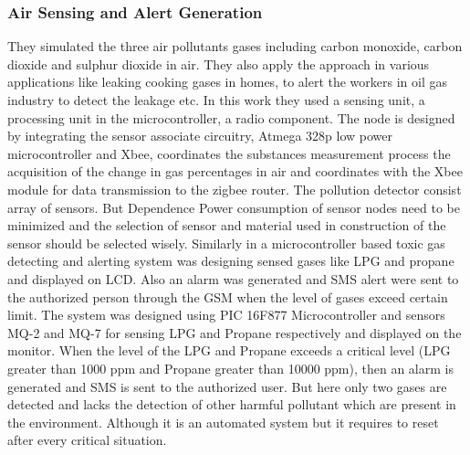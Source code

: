 \subsubsection{Air Sensing and Alert Generation}
They simulated the three air pollutants gases including carbon monoxide, carbon dioxide and sulphur dioxide in air. They also apply the approach in various applications like leaking cooking gases in homes, to alert the workers in oil gas industry to detect the leakage etc. In this work they used a sensing unit, a processing unit in the microcontroller, a radio component. The node is designed by integrating the sensor associate circuitry, Atmega 328p low power microcontroller and Xbee, coordinates the substances measurement process the acquisition of the change in gas percentages in air and coordinates with the Xbee module for data transmission to the zigbee router. The pollution detector consist array of sensors. But Dependence Power consumption of sensor nodes need to be minimized and the selection of sensor and material used in construction of the sensor should be selected wisely. Similarly in a microcontroller based toxic gas detecting and alerting system was designing sensed gases like LPG and propane and displayed on LCD. Also an alarm was generated and SMS alert were sent to the authorized person through the GSM when the level of gases exceed certain limit. The system was designed using PIC 16F877 Microcontroller and sensors MQ-2 and MQ-7 for sensing LPG and Propane respectively and displayed on the monitor. When the level of the LPG and Propane exceeds a critical level (LPG greater than 1000 ppm and Propane greater than 10000 ppm), then an alarm is generated and SMS is sent to the authorized user. But here only two gases are detected and lacks the detection of other harmful pollutant which are present in the environment. Although it is an automated system but it requires to reset after every critical situation.

